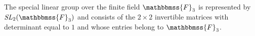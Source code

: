 \documentclass[12pt]{article}
\newcommand{\F}{\mathbbmss{F}}
\begin{document}
The special linear group over the finite field $\F_3$ is represented by 
$\mathit{SL}_2(\F_3)$
and consists of the $2\times 2$ invertible matrices with determinant equal to $1$ and whose entries belong to $\F_3$.
\end{document}
